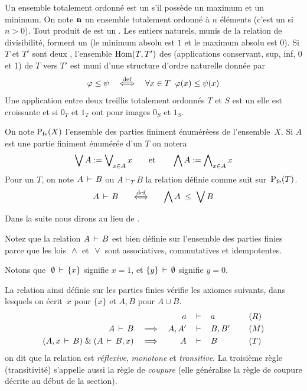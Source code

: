 Un ensemble totalement ordonné est un \trdi s'il possède un maximum
et un minimum. On note ${\bf n}$ un ensemble totalement ordonné
à $n$ éléments (c'est un \trdi si $n> 0$).
Tout produit de \trdis est un \trdi.
Les entiers naturels, munis de la relation de divisibilité,
forment un \trdi (le minimum absolu est $1$  et le maximum absolu est
$0$).
Si $T$  et $T'$ sont deux \trdis, l'ensemble ${\rm Hom}(T,T')$ des \homos
(applications conservant, sup, inf, 0 et 1) de  $T$ vers $T'$ est muni
d'une structure d'ordre naturelle donnée par
$$ \varphi \leq \psi \equidef  \forall x\in T\;
\;
\varphi(x) \leq \psi(x)
$$
Une application entre deux treillis totalement ordonnés $T$ et $S$
est un \homo \ssi elle est croissante et si $0_T$  et $1_T$  ont pour images
$0_S$ et $1_S$.


\begin{notations}
{\rm  On note ${{\rm P}_{{\rm fe}}}(X)$ l'ensemble des parties finiment énuméréess de l'ensemble~$X$.
Si $A$  est une partie finiment énumérée d'un \trdi $T$ on notera
$$ \bigvee A:=\bigvee\nolimits_{\!x\in A}x\qquad {\rm et}\qquad \bigwedge A:=\bigwedge\nolimits_{x\in A}x
$$
Pour un \trdi $T$, on note $A \,\vdash\, B$ ou $A \vdash_T B$ la relation définie comme suit sur~${{\rm P}_{{\rm fe}}}(T)$.
$$ A \vda B \; \; \equidef\; \; \Vi A\;\leq \;
\Vu B
$$
}
\end{notations}

Dans la suite nous dirons  au lieu de .
 
Notez que la relation  $A \,\vdash\, B$ est bien définie sur l'ensemble des
parties finies parce que les lois~$\,\wedge\,$  et~$\,\vee\,$  sont associatives,
commutatives et idempotentes.


Notons que $\; \emptyset  \,\vdash\, \{x\}$ signifie $x=1$, et
$ \{y\} \,\vdash\, \emptyset$ signifie $y=0$.

La relation ainsi définie sur les parties finies vérifie les axiomes suivants, dans lesquels on
écrit~$x$ pour $\{x\}$ et $A,B$  pour $ A\cup B$.
$$\begin{array}{rcrclll}
&    & a  &\,\vdash\,& a    &\; &(R)     \\[.3em]
A \,\vdash\, B &   \; \Longrightarrow \;  & A,A' &\,\vdash\,& B,B'   &\; &(M)     \\[.3em]
(A,x \,\vdash\, B)\;
\&
\;(A \,\vdash\, B,x)  &   \Longrightarrow  & A &\,\vdash\,& B &\;
&(T)
\end{array}$$
on dit que la relation est \emph{réflexive}, \label{remotr} \emph{monotone} et
\emph{transitive}. La troisième règle (transitivité) s'appelle aussi la
règle de \emph{coupure} (elle généralise la règle de coupure décrite au début de la section).

